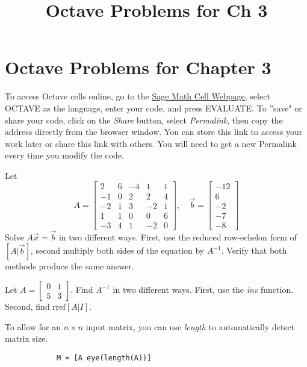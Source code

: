 \documentclass{ximera}
\title{Octave Problems for Ch 3} \license{CC BY-NC-SA 4.0}
\begin{document}
\begin{abstract}
\end{abstract}
\maketitle

\section*{Octave Problems for Chapter 3}

To access Octave cells online, go to the \href{https://sagecell.sagemath.org/}{Sage Math Cell Webpage}, select OCTAVE as the language, enter your code, and press EVALUATE.  
To ''save" or share your code, click on the \emph{Share} button, select \emph{Permalink}, then copy the address directly from the browser window.  You can store this link to access your work later or share this link with others.  You will need to get a new Permalink every time you modify the code.


\begin{problem}\label{prob_oct_7}
    Let $$A=\begin{bmatrix}2 & 6 & -4 & 1 & 1\\
-1 & 0 & 2 & 2 & 4\\
-2 & 1 & 3 & -2 & 1\\
1 & 1 & 0 & 0 & 6\\
-3 & 4 & 1 & -2 & 0\end{bmatrix}, \quad \vec{b}=\begin{bmatrix}-12\\
 6\\
 -2\\
 -7\\
 -8\end{bmatrix}$$
Solve $A\vec{x}=\vec{b}$ in two different ways.  First, use the reduced row-echelon form of $[A|\vec{b}]$, second multiply both sides of the equation by $A^{-1}$.  Verify that both methods produce the same answer.
\end{problem}

\begin{problem}\label{prob_oct_mat1}
Let $A=\begin{bmatrix} 0 & 1\\5 & 3\end{bmatrix}$.  Find $A^{-1}$ in two different ways.  First, use the \emph{inv} function.  Second, find $\text{rref}[A|I]$.
    \begin{hint}
        To allow for an $n\times n$ input matrix, you can use \emph{length} to automatically detect matrix size.
        
        \begin{verbatim}
            M = [A eye(length(A))]  
        \end{verbatim}
    \end{hint}
\end{problem}   
\end{document}
